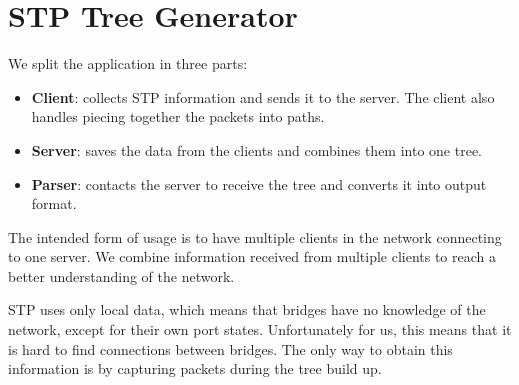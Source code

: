 \chapter{STP Tree Generator}
\label{stp-gen}
We split the application in three parts:
\begin{itemize}
    \item \textbf{Client}: collects STP information and sends it to the server.
        The client also handles piecing together the packets into paths.
    \item \textbf{Server}: saves the data from the clients and combines them into one tree.
    \item \textbf{Parser}: contacts the server to receive the tree and converts it into output format.
\end{itemize}
The intended form of usage is to have multiple clients in the network connecting to one server.
We combine information received from multiple clients to reach a better understanding of the network.

STP uses only local data, which means that bridges have no knowledge of the network, except for their own port states.
Unfortunately for us, this means that it is hard to find connections between bridges.
The only way to obtain this information is by capturing packets during the tree build up.

